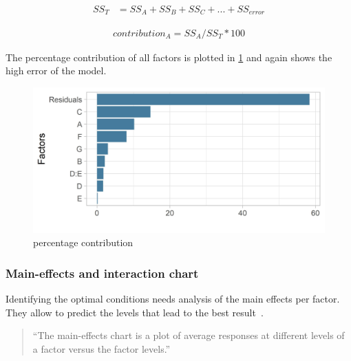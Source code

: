 \begin{equation}
	\begin{split}
		SS_T & = SS_A + SS_B + SS_C + ... + SS_{error}
	\end{split}
	 \label{equ:hyperparam_tuning:ss_t}
\end{equation}

\begin{equation}
	\begin{split}
		contribution_A = SS_A / SS_T * 100
	\end{split}
	 \label{equ:hyperparam_tuning:contribution}
\end{equation}

The percentage contribution of all factors is plotted in \ref{fig:hyperparam_tuning:percentage_contribution} and again shows the high error of the model. 

\begin{figure}[ht] 
	\includegraphics[width=1\linewidth]{simulations/taguchi/plots/percentage_contribution}
	\caption{percentage contribution}
	\label{fig:hyperparam_tuning:percentage_contribution}
\end{figure}

\subsubsection{Main-effects and interaction chart}
Identifying the optimal conditions needs analysis of the main effects per factor. They allow to predict the levels that lead to the best result~\cite{roy_primer_1990}.

\begin{quote}
	\begin{em}
		\enquote{The main-effects chart is a plot of average responses at different levels of a factor versus the factor levels.}~\cite{yang_design_2009}
	\end{em}
\end{quote}


